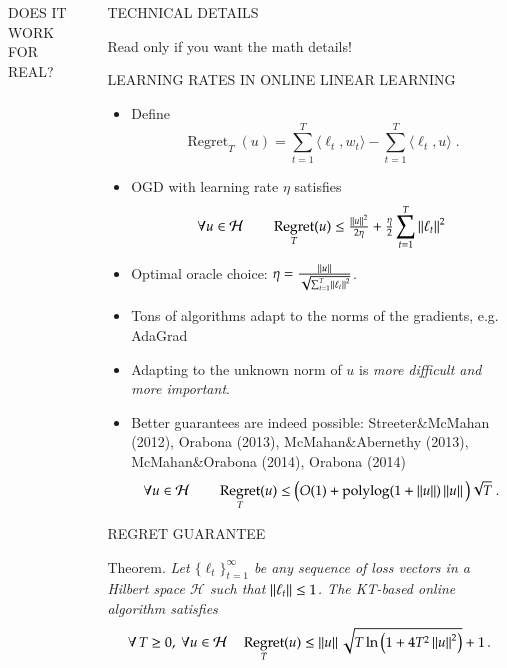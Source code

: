 \documentclass[final,t,serif,mathserif]{beamer}
\renewcommand{\H}{\mathcal{H}}  %
\DeclareMathOperator{\Regret}{Regret}
\DeclareMathOperator{\polylog}{polylog}
\def\blockspaceb{\vspace{0.08cm}}
\def\blockspacec{\vspace{0.25cm}}
\begin{document}
\begin{frame}{}
\begin{columns}[t]
\begin{column}{.33\linewidth}
\begin{block}{DOES IT WORK FOR REAL?}
       \blockspaceb
       
    \end{block}
\end{column}


\begin{column}{.33\linewidth}

    \begin{block}{TECHNICAL DETAILS}
    \begin{minipage}{.98\linewidth}

    \blockspacec
    
    Read only if you want the math details!
    
    \blockspacec

    \begin{block}{LEARNING RATES IN ONLINE LINEAR LEARNING}
    \blockspacec
    
    \begin{itemize}
      \item Define
      \[
        \Regret_T(u) = \sum_{t=1}^T \langle \ell_t, w_t \rangle - \sum_{t=1}^T \langle \ell_t, u \rangle  \; .
      \]
      \item OGD with learning rate $\eta$ satisfies
	\[
	\forall u \in \H \qquad \Regret_T(u) \le \tfrac{\norm{u}^2}{2\eta} + \tfrac{\eta}{2} \sum_{t=1}^T \norm{\ell_t}^2
	\]
      \item Optimal oracle choice: $\eta = \frac{\left\|{u}\right\|}{\sqrt{\sum_{t=1}^T \left\|{\ell_t}\right\|^2}}$.
      \item Tons of algorithms adapt to the norms of the gradients, e.g. AdaGrad
      \item Adapting to the unknown norm of $u$ is \emph{more difficult and more important}.
      \item Better guarantees are indeed possible: Streeter\&McMahan (2012), Orabona (2013), McMahan\&Abernethy (2013), McMahan\&Orabona (2014), Orabona (2014) 
	\[
	\forall u \in \H \qquad \Regret_T(u) \le \big(O(1)+\polylog(1 + \norm{u})\norm{u} \big) \sqrt{T} \; .
	\]
    \end{itemize}
    
    \blockspacec
    \end{block}

    \begin{block}{REGRET GUARANTEE}
    \blockspacec
    
    \alert{Theorem.} \emph{
	Let $\{\ell_t\}_{t=1}^\infty$ be any sequence of loss vectors
	in a Hilbert space $\H$ such that $\left\|{\ell_t}\right\| \le 1$.
	The KT-based online algorithm satisfies
	$$
	\forall \, T \ge 0, \
	\forall u \in \H \quad
	\Regret_T(u) \le \norm{u} \sqrt{T \ln\left(1 + 4T^2 \norm{u}^2 \right)} + 1 \, .
	$$
    }


\end{block}
\end{minipage}
\end{block}
\end{column}
\end{columns}
\end{frame}
\end{document}

